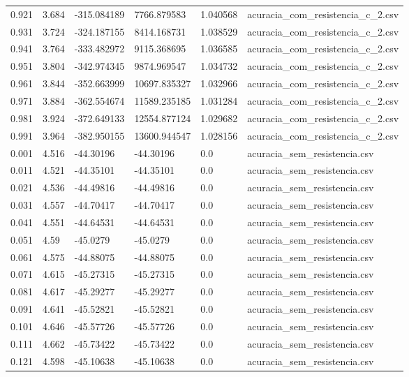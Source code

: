 \begin{table}
\begin{tabular}{llllll}
0.921 & 3.684 & -315.084189 & 7766.879583 & 1.040568 & acuracia\_com\_resistencia\_c\_2.csv \\
0.931 & 3.724 & -324.187155 & 8414.168731 & 1.038529 & acuracia\_com\_resistencia\_c\_2.csv \\
0.941 & 3.764 & -333.482972 & 9115.368695 & 1.036585 & acuracia\_com\_resistencia\_c\_2.csv \\
0.951 & 3.804 & -342.974345 & 9874.969547 & 1.034732 & acuracia\_com\_resistencia\_c\_2.csv \\
0.961 & 3.844 & -352.663999 & 10697.835327 & 1.032966 & acuracia\_com\_resistencia\_c\_2.csv \\
0.971 & 3.884 & -362.554674 & 11589.235185 & 1.031284 & acuracia\_com\_resistencia\_c\_2.csv \\
0.981 & 3.924 & -372.649133 & 12554.877124 & 1.029682 & acuracia\_com\_resistencia\_c\_2.csv \\
0.991 & 3.964 & -382.950155 & 13600.944547 & 1.028156 & acuracia\_com\_resistencia\_c\_2.csv \\
0.001 & 4.516 & -44.30196 & -44.30196 & 0.0 & acuracia\_sem\_resistencia.csv \\
0.011 & 4.521 & -44.35101 & -44.35101 & 0.0 & acuracia\_sem\_resistencia.csv \\
0.021 & 4.536 & -44.49816 & -44.49816 & 0.0 & acuracia\_sem\_resistencia.csv \\
0.031 & 4.557 & -44.70417 & -44.70417 & 0.0 & acuracia\_sem\_resistencia.csv \\
0.041 & 4.551 & -44.64531 & -44.64531 & 0.0 & acuracia\_sem\_resistencia.csv \\
0.051 & 4.59 & -45.0279 & -45.0279 & 0.0 & acuracia\_sem\_resistencia.csv \\
0.061 & 4.575 & -44.88075 & -44.88075 & 0.0 & acuracia\_sem\_resistencia.csv \\
0.071 & 4.615 & -45.27315 & -45.27315 & 0.0 & acuracia\_sem\_resistencia.csv \\
0.081 & 4.617 & -45.29277 & -45.29277 & 0.0 & acuracia\_sem\_resistencia.csv \\
0.091 & 4.641 & -45.52821 & -45.52821 & 0.0 & acuracia\_sem\_resistencia.csv \\
0.101 & 4.646 & -45.57726 & -45.57726 & 0.0 & acuracia\_sem\_resistencia.csv \\
0.111 & 4.662 & -45.73422 & -45.73422 & 0.0 & acuracia\_sem\_resistencia.csv \\
0.121 & 4.598 & -45.10638 & -45.10638 & 0.0 & acuracia\_sem\_resistencia.csv \\

\end{tabular}
\end{table}
